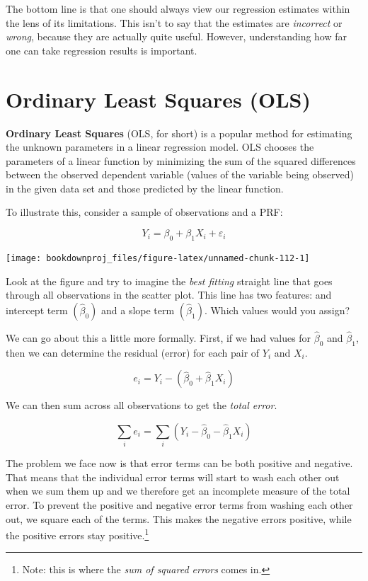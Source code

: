 \documentclass[
]{book}
\begin{document}
The bottom line is that one should always view our regression estimates within the lens of its limitations. This isn't to say that the estimates are \emph{incorrect} or \emph{wrong}, because they are actually quite useful. However, understanding how far one can take regression results is important.

\section{Ordinary Least Squares (OLS)}\label{ordinary-least-squares-ols}

\textbf{Ordinary Least Squares} (OLS, for short) is a popular method for estimating the unknown parameters in a linear regression model. OLS chooses the parameters of a linear function by minimizing the sum of the squared differences between the observed dependent variable (values of the variable being observed) in the given data set and those predicted by the linear function.

To illustrate this, consider a sample of observations and a PRF:

\[Y_i=\beta_0+\beta_1X_i+\varepsilon_i\]

\begin{center}\texttt{[image: bookdownproj\_files/figure-latex/unnamed-chunk-112-1]} \end{center}

Look at the figure and try to imagine the \emph{best fitting} straight line that goes through all observations in the scatter plot. This line has two features: and intercept term \((\hat{\beta}_0)\) and a slope term \((\hat{\beta}_1)\). Which values would you assign?

We can go about this a little more formally. First, if we had values for \(\hat{\beta}_0\) and \(\hat{\beta}_1\), then we can determine the residual (error) for each pair of \(Y_i\) and \(X_i\).

\[e_i = Y_i - (\hat{\beta}_0 + \hat{\beta}_1X_i)\]

We can then sum across all observations to get the \emph{total error}.

\[\sum_{i}e_i = \sum_{i}(Y_i - \hat{\beta}_0 - \hat{\beta}_1X_i)\]

The problem we face now is that error terms can be both positive and negative. That means that the individual error terms will start to wash each other out when we sum them up and we therefore get an incomplete measure of the total error. To prevent the positive and negative error terms from washing each other out, we square each of the terms. This makes the negative errors positive, while the positive errors stay positive.\footnote{Note: this is where the \emph{sum of squared errors} comes in.}
\end{document}
